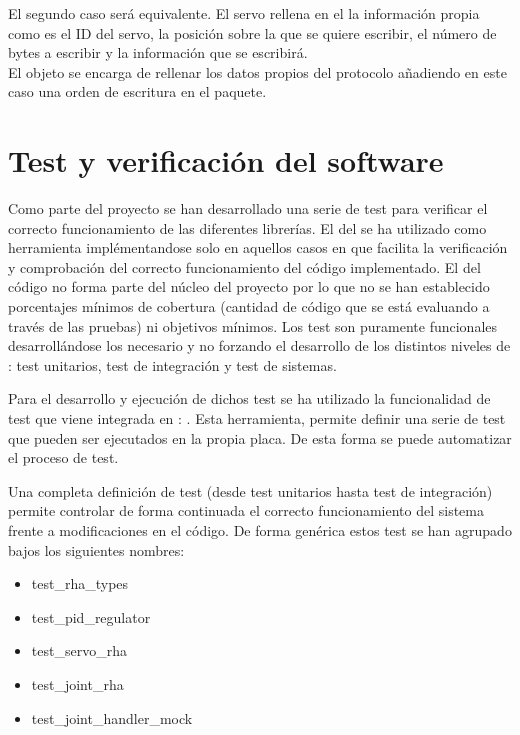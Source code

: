
	El segundo caso será equivalente. El servo rellena en el  la información propia como es el ID del servo, la posición sobre la que se quiere escribir, el número de bytes a escribir y la información que se escribirá.
	\\
	El objeto  se encarga de rellenar los datos propios del protocolo añadiendo en este caso una orden de escritura en el paquete.
	\\


\section{Test y verificación del software} \label{sec:SW:test}
    Como parte del proyecto se han desarrollado una serie de test para verificar el correcto funcionamiento de las diferentes librerías. El  del  se ha utilizado como herramienta implémentandose solo en aquellos casos en que facilita la verificación y comprobación del correcto funcionamiento del código implementado. El  del código no forma parte del núcleo del proyecto por lo que no se han establecido porcentajes mínimos de cobertura (cantidad de código que se está evaluando a través de las pruebas) ni objetivos mínimos. Los test son puramente funcionales desarrollándose los necesario y no forzando el desarrollo de los distintos niveles de : test unitarios, test de integración y test de sistemas. 

    Para el desarrollo y ejecución de dichos test se ha utilizado la funcionalidad de test que viene integrada en : . Esta herramienta, permite definir una serie de test que pueden ser ejecutados en la propia placa. De esta forma se puede automatizar el proceso de test.

    Una completa definición de test (desde test unitarios hasta test de integración) permite controlar de forma continuada el correcto funcionamiento del sistema frente a modificaciones en el código. De forma genérica estos test se han agrupado bajos los siguientes nombres:

    \begin{itemize}
        \item test\_rha\_types
        \item test\_pid\_regulator
        \item test\_servo\_rha
        \item test\_joint\_rha
        \item test\_joint\_handler\_mock
    \end{itemize}

